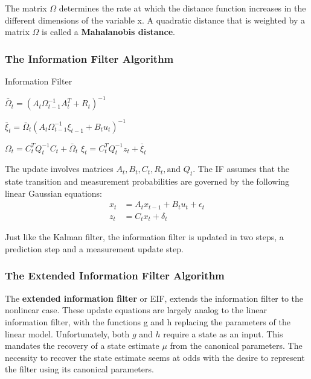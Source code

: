 The matrix $\Omega$ determines the rate at which the distance function increases in the different dimensions of the variable x.
A quadratic distance that is weighted by a matrix $\Omega$ is called a \textbf{Mahalanobis distance}.

\subsubsection{The Information Filter Algorithm}

\begin{algorithm}[H]
\caption{Information Filter}

\BlankLine
{}
$\bar{\Omega}_t = (A_t \Omega_{t-1}^{-1} A_t^T + R_t)^{-1}$\;

$\bar{\xi}_t = \bar{\Omega}_t (A_t \Omega_{t-1}^{-1}\xi_{t-1} + B_t u_t)^{-1}$\;

\BlankLine
{}

$\Omega_t = C_t^T Q_t^{-1} C_t + \bar{\Omega}_t$\;
$\xi_t = C_t^T Q_t^{-1} z_t + \bar{\xi}_t $\;

\BlankLine
{}
\end{algorithm}

\vspace{2mm}

The update involves matrices $A_t, B_t, C_t, R_t, \text{and } Q_t$.
The IF assumes that the state transition and measurement probabilities are governed by the following linear Gaussian equations:
\begin{align}
  x_t &= A_t x_{t-1} + B_t u_t + \epsilon_t \\
  z_t &= C_t x_t + \delta_t
\end{align}

Just like the Kalman filter, the information filter is updated in two steps, a prediction step and a measurement update step.

\subsubsection{The Extended Information Filter Algorithm}

The \textbf{extended information filter} or EIF, extends the information filter to the nonlinear case.
These update equations are largely analog to the linear information filter, with the functions g and h replacing the parameters of the linear model.
Unfortunately, both $g$ and $h$ require a state as an input.
This mandates the recovery of a state estimate $\mu$ from the canonical parameters.
The necessity to recover the state estimate seems at odds with the desire to represent the filter using its canonical parameters.

